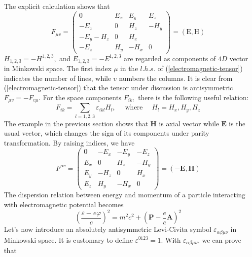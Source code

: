 The explicit calculation shows that
\begin{equation}
F_{\mu v}=\left(\begin{array}{cccc}
{0} & {E_{x}} & {E_{y}} & {E_{z}} \\
{-E_{x}} & {0} & {H_{z}} & {-H_{y}} \\
{-E_{y}-H_{z}} & {0} & {H_{x}} \\
{-E_{z}} & {H_{y}} & {-H_{x}} & {0}
\end{array}\right)=(\mathrm{E}, \mathrm{H})
\label{electromagnetic-tensor}
\end{equation}
$H_{1,2,3}=-H^{1,2,3},$ and $E_{1,2,3}=-E^{1,2,3}$ are regarded as components of $4 D$ vector in Minkowski space. The first index $\mu$ in the $l . h . s .$ of (\ref{electromagnetic-tensor}) indicates the number of lines, while $v$ numbers the columns. It is clear from (\ref{electromagnetic-tensor}) that the tensor under discussion is antisymmetric $F_{\mu v}=-F_{v \mu} .$ For the space components $F_{i k},$ there is the following useful relation:
\begin{equation}
F_{i k}=\sum_{l=1,2,3} \varepsilon_{i k l} H_{l}, \quad \text { where } \quad H_{l}=H_{x}, H_{y}, H_{z}
\end{equation}
The example in the previous section shows that $\mathbf{H}$ is axial vector while $\mathbf{E}$ is the usual vector, which changes the sign of its components under parity transformation. By raising indices, we have
\begin{equation}
F^{\mu v}=\left(\begin{array}{cccc}
{0} & {-E_{x}} & {-E_{y}} & {-E_{z}} \\
{E_{x}} & {0} & {H_{z}} & {-H_{y}} \\
{E_{y}} & {-H_{z}} & {0} & {H_{x}} \\
{E_{z}} & {H_{y}} & {-H_{x}} & {0}
\end{array}\right)=(-\mathbf{E}, \mathbf{H})
\end{equation}
The dispersion relation between energy and momentum of a particle
interacting with electromagnetic potential becomes
\begin{equation}
\left(\frac{\varepsilon-e \varphi}{c}\right)^{2}=m^{2} c^{2}+\left(\mathbf{P}-\frac{e}{c} \mathbf{A}\right)^{2}
\end{equation}
Let's now introduce an absolutely antisymmetric Levi-Civita symbol $\varepsilon_{\alpha \beta \mu \nu}$ in Minkowski space. It is customary to define $\varepsilon^{\mathrm{0123}}=1$. With $\varepsilon_{\alpha \beta \mu \nu}$, we can prove that
